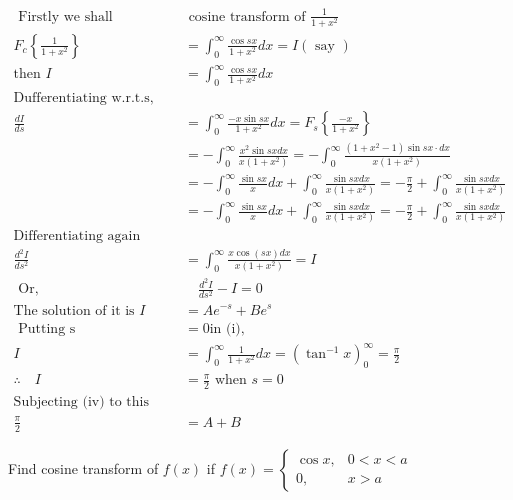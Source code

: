 \begin{answer}
	\begin{align*}
	\text { Firstly we shall determine}&\text{ cosine transform of } \frac{1}{1+x^{2}}\\
	F_{c}\left\{\frac{1}{1+x^{2}}\right\}&=\int_{0}^{\infty} \frac{\cos s x}{1+x^{2}} d x=I(\text { say })\\
	\text{then }I&=\int_{0}^{\infty} \frac{\cos s x}{1+x^{2}} d x\\
	\text{Dufferentiating w.r.t.s,}\\
	\frac{d I}{d s} &=\int_{0}^{\infty} \frac{-x \sin s x}{1+x^{2}} d x=F_{s}\left\{\frac{-x}{1+x^{2}}\right\} \\
	&=-\int_{0}^{\infty} \frac{x^{2} \sin s x d x}{x\left(1+x^{2}\right)}=-\int_{0}^{\infty} \frac{\left(1+x^{2}-1\right) \sin s x \cdot d x}{x\left(1+x^{2}\right)}\\
	&=-\int_{0}^{\infty} \frac{\sin s x}{x} d x+\int_{0}^{\infty} \frac{\sin s x d x}{x\left(1+x^{2}\right)}=-\frac{\pi}{2}+\int_{0}^{\infty} \frac{\sin s x d x}{x\left(1+x^{2}\right)}\\
	&=-\int_{0}^{\infty} \frac{\sin s x}{x} d x+\int_{0}^{\infty} \frac{\sin s x d x}{x\left(1+x^{2}\right)}=-\frac{\pi}{2}+\int_{0}^{\infty} \frac{\sin s x d x}{x\left(1+x^{2}\right)}\\
	\text{Differentiating again w.r.t. s,}\\
	\frac{d^{2} I}{d s^{2}}&=\int_{0}^{\infty} \frac{x \cos (s x) d x}{x\left(1+x^{2}\right)}=I\\
	\text { Or, } &\quad \frac{d^{2} I}{d s^{2}}-I=0\\
	\text{The solution of it is }I&=A e^{-s}+B e^{s}\\
	\text{ Putting }\mathrm{s}&=0 \text{in (i),}\\
	I &=\int_{0}^{\infty} \frac{1}{1+x^{2}} d x=\left(\tan ^{-1} x\right)_{0}^{\infty}=\frac{\pi}{2} \\
	\therefore \quad I &=\frac{\pi}{2} \text { when } s=0\\
	\text{Subjecting (iv) to this condition}\\
	\frac{\pi}{2}&=A+B
	\end{align*}
\end{answer}
\begin{exercise}
	Find cosine transform of $f(x)$ if $f(x)= \begin{cases}\cos x, & 0<x<a \\ 0, & x>a\end{cases}$
\end{exercise}
